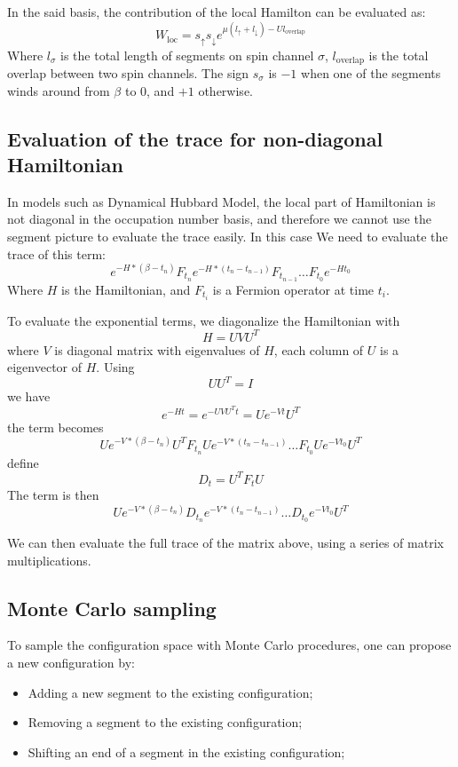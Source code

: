 In the said basis, the contribution of the local Hamilton can be evaluated as:
\begin{equation}
\label{eq:weight_local}
W_{\textrm{loc}} = s_\uparrow s_\downarrow e ^{\mu(l_\uparrow+l_\downarrow)-Ul_{\textrm{overlap}}}
\end{equation}
Where $l_\sigma$ is the total length of segments on spin channel $\sigma$,
$l_{\textrm{overlap}}$ is the total overlap between two spin channels. The sign 
$s_\sigma$ is $-1$ when one of the segments winds around from $\beta$ to $0$, 
and $+1$ otherwise.

\subsection{Evaluation of the trace for non-diagonal Hamiltonian}
\label{sec:trace}
In models such as Dynamical Hubbard Model, the local part of Hamiltonian is not
diagonal in the occupation number basis, and therefore we cannot use the segment
picture to evaluate the trace easily. In this case We need to evaluate the 
trace of this term:
\begin{equation}
  \label{eq:1}
  e^{-H*(\beta-t_n)}F_{t_n}e^{-H*(t_n-t_{n-1})}F_{t_{n-1}}\ldots F_{t_0}e^{-Ht_0}  
\end{equation}
Where $H$ is the Hamiltonian, and $F_{t_{i}}$ is a Fermion operator at time $t_i$.

To evaluate the exponential terms, we diagonalize the Hamiltonian with
\[
H=UVU^T
\]
where $V$ is diagonal matrix with eigenvalues of $H$, each column of $U$ is a
eigenvector of $H$.
Using
\[
UU^T=I
\]
we have 
\[
e^{-Ht}=e^{-UVU^Tt}=Ue^{-Vt}U^T
\]
 the term becomes
\[
Ue^{-V*(\beta-t_n)}U^TF_{t_n}Ue^{-V*(t_n-t_{n-1})}\ldots F_{t_0}Ue^{-Vt_0}U^T
\]
define 
\[
D_t=U^TF_tU
\]
The term is then
\begin{equation}
  \label{eq:2}
  Ue^{-V*(\beta-t_n)}D_{t_n}e^{-V*(t_n-t_{n-1})}\ldots D_{t_0}e^{-Vt_0}U^T  
\end{equation}

We can then evaluate the full trace of the matrix above, using a series of 
matrix multiplications.


\subsection{Monte Carlo sampling}
\label{sec:cthyb_mcs}
To sample the configuration space with Monte Carlo procedures, one can propose 
a new configuration by:
\begin{itemize}
\item Adding a new segment to the existing configuration;
\item Removing a segment to the existing configuration;
\item Shifting an end of a segment in the existing configuration;
\end{itemize}


